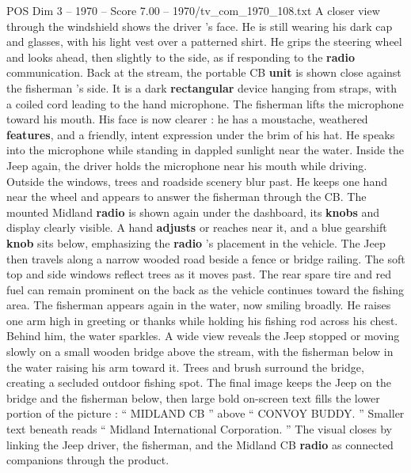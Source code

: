 \begin{textsample}{POS Dim 3 – 1970 – Score 7.00 – 1970/tv\_com\_1970\_108.txt}
A closer view through the windshield shows the driver ’s face.
He is still wearing his dark cap and glasses, with his light vest over a patterned shirt.
He grips the steering wheel and looks ahead, then slightly to the side, as if responding to the \textbf{radio} communication.
Back at the stream, the portable CB \textbf{unit} is shown close against the fisherman ’s side.
It is a dark \textbf{rectangular} device hanging from straps, with a coiled cord leading to the hand microphone.
The fisherman lifts the microphone toward his mouth.
His face is now clearer : he has a moustache, weathered \textbf{features}, and a friendly, intent expression under the brim of his hat.
He speaks into the microphone while standing in dappled sunlight near the water.
Inside the Jeep again, the driver holds the microphone near his mouth while driving.
Outside the windows, trees and roadside scenery blur past.
He keeps one hand near the wheel and appears to answer the fisherman through the CB.
The mounted Midland \textbf{radio} is shown again under the dashboard, its \textbf{knobs} and display clearly visible.
A hand \textbf{adjusts} or reaches near it, and a blue gearshift \textbf{knob} sits below, emphasizing the \textbf{radio} ’s placement in the vehicle.
The Jeep then travels along a narrow wooded road beside a fence or bridge railing.
The soft top and side windows reflect trees as it moves past.
The rear spare tire and red fuel can remain prominent on the back as the vehicle continues toward the fishing area.
The fisherman appears again in the water, now smiling broadly.
He raises one arm high in greeting or thanks while holding his fishing rod across his chest.
Behind him, the water sparkles.
A wide view reveals the Jeep stopped or moving slowly on a small wooden bridge above the stream, with the fisherman below in the water raising his arm toward it.
Trees and brush surround the bridge, creating a secluded outdoor fishing spot.
The final image keeps the Jeep on the bridge and the fisherman below, then large bold on-screen text fills the lower portion of the picture : “ MIDLAND CB ” above “ CONVOY BUDDY. ” Smaller text beneath reads “ Midland International Corporation. ” The visual closes by linking the Jeep driver, the fisherman, and the Midland CB \textbf{radio} as connected companions through the product.

\end{textsample}
